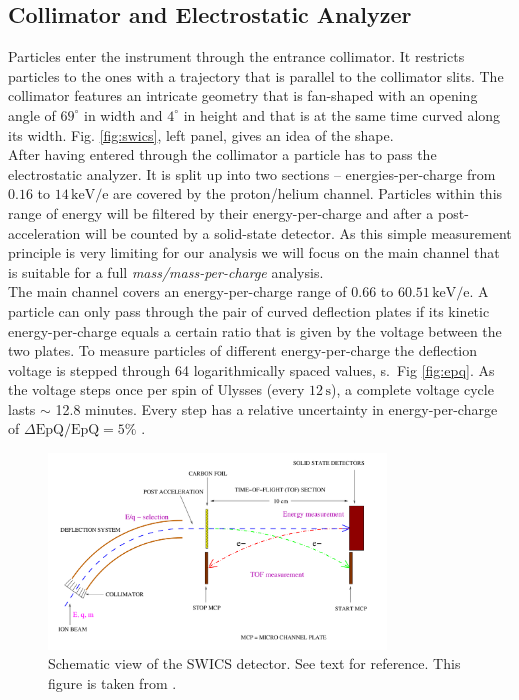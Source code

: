\subsection{Collimator and Electrostatic Analyzer}
\label{sec:EpQ}
Particles enter the instrument through the entrance collimator. It restricts particles to the ones with a trajectory that is parallel to the collimator slits.  The collimator features an intricate geometry that is fan-shaped with an opening angle of $69^\circ$ in width and $4^\circ$ in height and that is at the same time curved along its width. Fig. \ref{fig:swics}, left panel,  gives an idea of the shape.\\
After having entered through the collimator a particle has to pass the electrostatic analyzer. It is split up into two sections -- energies-per-charge from $0.16$ to $14\,\mathrm{keV/e}$ are covered by the proton/helium channel. Particles within this range of energy will be filtered by their energy-per-charge and after a post-acceleration will be counted by a solid-state detector. As this simple measurement principle is very limiting for our analysis we will focus on the main channel that is suitable for a full \textit{mass/mass-per-charge} analysis.\\
The main channel covers an energy-per-charge range of $0.66$ to $60.51\,\mathrm{keV/e}$. A particle can only pass through the pair of curved deflection plates if its kinetic energy-per-charge equals a certain ratio that is given by the voltage between the two plates. To measure particles of different energy-per-charge the deflection voltage is stepped through 64 logarithmically spaced values, s.~Fig \ref{fig:epq}. As the voltage steps once per spin of Ulysses (every $12\,\mathrm{s}$), a complete voltage cycle lasts $\sim$ 12.8 minutes. 
Every step has a relative uncertainty in energy-per-charge of $\Delta \mathrm{EpQ / EpQ = 5\%}$ \citep{gloeckler_1992}.
%
%
%
\begin{figure}[h]
	\includegraphics[width=0.8\textwidth]{Figures/Lars_Swics.png}
	\centering
	\caption{Schematic view of the SWICS detector. See text for reference. This figure is taken from \citet{lars-phd}.}
	\label{fig:lars_swics}
\end{figure}


